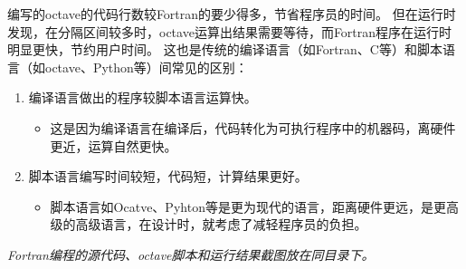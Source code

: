 \documentclass[hyperref,UTF-8]{ctexart}
\begin{document}
编写的octave的代码行数较Fortran的要少得多，节省程序员的时间。
但在运行时发现，在分隔区间较多时，octave运算出结果需要等待，而Fortran程序在运行时明显更快，节约用户时间。
这也是传统的编译语言（如Fortran、C等）和脚本语言（如octave、Python等）间常见的区别：
\begin{enumerate}
\item 编译语言做出的程序较脚本语言运算快。
\begin{itemize}
\item 这是因为编译语言在编译后，代码转化为可执行程序中的机器码，离硬件更近，运算自然更快。
\end{itemize}
\item 脚本语言编写时间较短，代码短，计算结果更好。
\begin{itemize}
\item 脚本语言如Ocatve、Pyhton等是更为现代的语言，距离硬件更远，是更高级的高级语言，在设计时，就考虑了减轻程序员的负担。
\end{itemize}
\end{enumerate}
\emph{Fortran编程的源代码、octave脚本和运行结果截图放在同目录下。}
\end{document}
